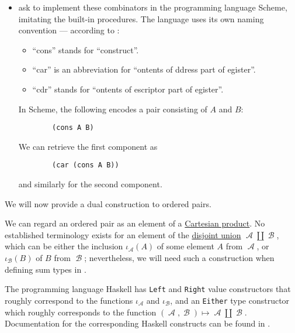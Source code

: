 \begin{example}
\begin{thmenum}
\begin{itemize}
      \item {} ask to implement these combinators in the programming language Scheme, imitating the built-in procedures. The language uses its own naming convention --- according to \cite[115]{AbelsonSussman2012eSICP}:
      \begin{itemize}
        \item \enquote{cons} stands for \enquote{construct}.
        \item \enquote{car} is an abbreviation for \enquote{ontents of ddress part of egister}.
        \item \enquote{cdr} stands for \enquote{ontents of escriptor part of egister}.
      \end{itemize}

      In Scheme, the following encodes a pair consisting of \( A \) and \( B \):
      \begin{verbatim}
        (cons A B)
      \end{verbatim}\vspace{-\baselineskip}

      We can retrieve the first component as
      \begin{verbatim}
        (car (cons A B))
      \end{verbatim}\vspace{-\baselineskip}
      and similarly for the second component.
    \end{itemize}

     We will now provide a dual construction to ordered pairs.

    We can regard an ordered pair as an element of a \hyperref[def:cartesian_product]{Cartesian product}. No established terminology exists for an element of the \hyperref[def:disjoint_union]{disjoint union} \( \mscrA \amalg \mscrB \), which can be either the inclusion \( \iota_\mscrA(A) \) of some element \( A \) from \( \mscrA \), or \( \iota_\mscrB(B) \) of \( B \) from \( \mscrB \); nevertheless, we will need such a construction when defining sum types in .

    The programming language Haskell has \verb|Left| and \verb|Right| value constructors that roughly correspond to the functions \( \iota_\mscrA \) and \( \iota_\mscrB \), and an \verb|Either| type constructor which roughly corresponds to the function \( (\mscrA, \mscrB) \mapsto \mscrA \amalg \mscrB \). Documentation for the corresponding Haskell constructs can be found in \cite{HackageDocs:base-4.21:either}.


\end{thmenum}
\end{example}

